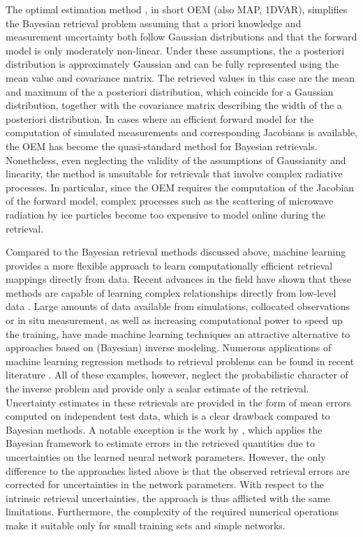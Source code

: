 \documentclass[journal abbreviation, manuscript]{copernicus}
\begin{document}
The optimal estimation method \citep{rodgers}, in short OEM (also MAP, 1DVAR),
simplifies the Bayesian retrieval problem assuming that a priori knowledge and
measurement uncertainty both follow Gaussian distributions and that the forward
model is only moderately non-linear. Under these assumptions, the a posteriori
distribution is approximately Gaussian and can be fully represented using the
mean value and covariance matrix. The retrieved values in this case are the mean
and maximum of the a posteriori distribution, which coincide for a Gaussian
distribution, together with the covariance matrix describing the width of the a
posteriori distribution. In cases where an efficient forward model for the
computation of simulated measurements and corresponding Jacobians is available,
the OEM has become the quasi-standard method for Bayesian retrievals.
Nonetheless, even neglecting the validity of the assumptions of Gaussianity and
linearity, the method is unsuitable for retrievals that involve complex
radiative processes. In particular, since the OEM requires the computation of the
Jacobian of the forward model, complex processes such as the scattering of
microwave radiation by ice particles become too expensive to model online during
the retrieval.

Compared to the Bayesian retrieval methods discussed above, machine learning
provides a more flexible approach to learn computationally efficient retrieval
mappings directly from data. Recent advances in the field have shown that
these methods are capable of learning complex relationships directly from
low-level data \citep{lecun}. Large amounts of data available from simulations,
collocated observations or in situ measurement, as well as increasing computational
power to speed up the training, have made machine learning techniques
an attractive alternative to approaches based on (Bayesian) inverse modeling.
Numerous applications of machine learning regression methods to retrieval
problems can be found in recent literature \citep{jimenez, holl, strandgren, wang, hakansson, brath}.
All of these examples, however, neglect the probabilistic character of the
inverse problem and provide only a scalar estimate of the retrieval. Uncertainty
estimates in these retrievals are provided in the form of mean errors
computed on independent test data, which is a clear drawback compared to
Bayesian methods. A notable exception is the work by \citet{aires_1, aires_2, aires_3},
which applies the Bayesian framework to estimate errors in the retrieved quantities due to uncertainties
on the learned neural network parameters. However, the only difference to the
approaches listed above is that the observed retrieval errors are corrected for
uncertainties in the network parameters. With respect to the intrinsic retrieval
uncertainties, the approach is thus afflicted with the same limitations.
Furthermore, the complexity of the required numerical operations make it
suitable only for small training sets and simple networks.
\end{document}
